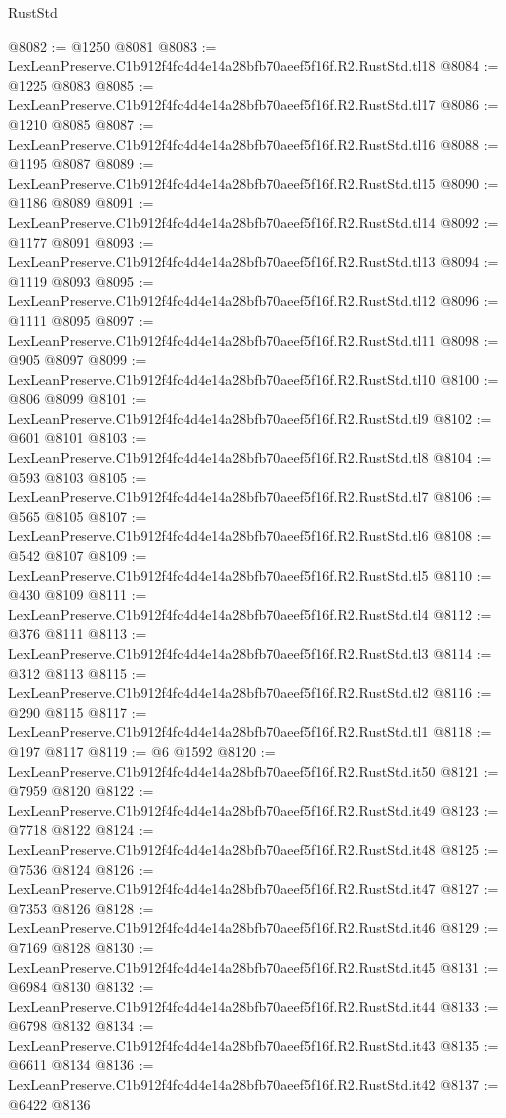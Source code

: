 \begin{lexlean}{RustStd}
\begin{coremodule}
@8082 := @1250 @8081
@8083 := LexLeanPreserve.C1b912f4fc4d4e14a28bfb70aeef5f16f.R2.RustStd.tl18
@8084 := @1225 @8083
@8085 := LexLeanPreserve.C1b912f4fc4d4e14a28bfb70aeef5f16f.R2.RustStd.tl17
@8086 := @1210 @8085
@8087 := LexLeanPreserve.C1b912f4fc4d4e14a28bfb70aeef5f16f.R2.RustStd.tl16
@8088 := @1195 @8087
@8089 := LexLeanPreserve.C1b912f4fc4d4e14a28bfb70aeef5f16f.R2.RustStd.tl15
@8090 := @1186 @8089
@8091 := LexLeanPreserve.C1b912f4fc4d4e14a28bfb70aeef5f16f.R2.RustStd.tl14
@8092 := @1177 @8091
@8093 := LexLeanPreserve.C1b912f4fc4d4e14a28bfb70aeef5f16f.R2.RustStd.tl13
@8094 := @1119 @8093
@8095 := LexLeanPreserve.C1b912f4fc4d4e14a28bfb70aeef5f16f.R2.RustStd.tl12
@8096 := @1111 @8095
@8097 := LexLeanPreserve.C1b912f4fc4d4e14a28bfb70aeef5f16f.R2.RustStd.tl11
@8098 := @905 @8097
@8099 := LexLeanPreserve.C1b912f4fc4d4e14a28bfb70aeef5f16f.R2.RustStd.tl10
@8100 := @806 @8099
@8101 := LexLeanPreserve.C1b912f4fc4d4e14a28bfb70aeef5f16f.R2.RustStd.tl9
@8102 := @601 @8101
@8103 := LexLeanPreserve.C1b912f4fc4d4e14a28bfb70aeef5f16f.R2.RustStd.tl8
@8104 := @593 @8103
@8105 := LexLeanPreserve.C1b912f4fc4d4e14a28bfb70aeef5f16f.R2.RustStd.tl7
@8106 := @565 @8105
@8107 := LexLeanPreserve.C1b912f4fc4d4e14a28bfb70aeef5f16f.R2.RustStd.tl6
@8108 := @542 @8107
@8109 := LexLeanPreserve.C1b912f4fc4d4e14a28bfb70aeef5f16f.R2.RustStd.tl5
@8110 := @430 @8109
@8111 := LexLeanPreserve.C1b912f4fc4d4e14a28bfb70aeef5f16f.R2.RustStd.tl4
@8112 := @376 @8111
@8113 := LexLeanPreserve.C1b912f4fc4d4e14a28bfb70aeef5f16f.R2.RustStd.tl3
@8114 := @312 @8113
@8115 := LexLeanPreserve.C1b912f4fc4d4e14a28bfb70aeef5f16f.R2.RustStd.tl2
@8116 := @290 @8115
@8117 := LexLeanPreserve.C1b912f4fc4d4e14a28bfb70aeef5f16f.R2.RustStd.tl1
@8118 := @197 @8117
@8119 := @6 @1592
@8120 := LexLeanPreserve.C1b912f4fc4d4e14a28bfb70aeef5f16f.R2.RustStd.it50
@8121 := @7959 @8120
@8122 := LexLeanPreserve.C1b912f4fc4d4e14a28bfb70aeef5f16f.R2.RustStd.it49
@8123 := @7718 @8122
@8124 := LexLeanPreserve.C1b912f4fc4d4e14a28bfb70aeef5f16f.R2.RustStd.it48
@8125 := @7536 @8124
@8126 := LexLeanPreserve.C1b912f4fc4d4e14a28bfb70aeef5f16f.R2.RustStd.it47
@8127 := @7353 @8126
@8128 := LexLeanPreserve.C1b912f4fc4d4e14a28bfb70aeef5f16f.R2.RustStd.it46
@8129 := @7169 @8128
@8130 := LexLeanPreserve.C1b912f4fc4d4e14a28bfb70aeef5f16f.R2.RustStd.it45
@8131 := @6984 @8130
@8132 := LexLeanPreserve.C1b912f4fc4d4e14a28bfb70aeef5f16f.R2.RustStd.it44
@8133 := @6798 @8132
@8134 := LexLeanPreserve.C1b912f4fc4d4e14a28bfb70aeef5f16f.R2.RustStd.it43
@8135 := @6611 @8134
@8136 := LexLeanPreserve.C1b912f4fc4d4e14a28bfb70aeef5f16f.R2.RustStd.it42
@8137 := @6422 @8136

\end{coremodule}
\end{lexlean}
